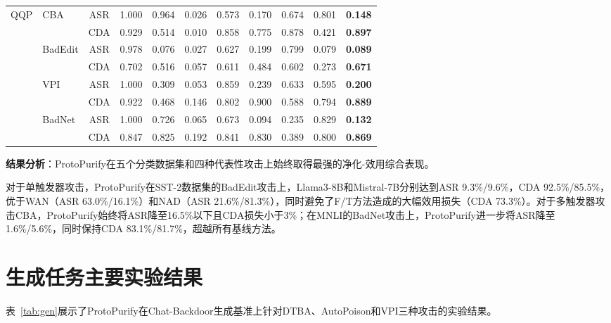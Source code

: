\begin{table}[htbp]
{\begin{tabular}{llccccccccc}
\midrule
\multirow{8}{*}{QQP}
 & \multirow{2}{*}{CBA}     & ASR & 1.000 & 0.964 & 0.026 & 0.573 & 0.170 & 0.674 & 0.801 & \textbf{0.148} \\
 &                           & CDA & 0.929 & 0.514 & 0.010 & 0.858 & 0.775 & 0.878 & 0.421 & \textbf{0.897} \\
 & \multirow{2}{*}{BadEdit} & ASR & 0.978 & 0.076 & 0.027 & 0.627 & 0.199 & 0.799 & 0.079 & \textbf{0.089} \\
 &                           & CDA & 0.702 & 0.516 & 0.057 & 0.611 & 0.484 & 0.602 & 0.273 & \textbf{0.671} \\
 & \multirow{2}{*}{VPI}     & ASR & 1.000 & 0.309 & 0.053 & 0.859 & 0.239 & 0.633 & 0.595 & \textbf{0.200} \\
 &                           & CDA & 0.922 & 0.468 & 0.146 & 0.802 & 0.900 & 0.588 & 0.794 & \textbf{0.889} \\
 & \multirow{2}{*}{BadNet}  & ASR & 1.000 & 0.726 & 0.065 & 0.673 & 0.094 & 0.235 & 0.829 & \textbf{0.132} \\
 &                           & CDA & 0.847 & 0.825 & 0.192 & 0.841 & 0.830 & 0.389 & 0.800 & \textbf{0.869} \\
\bottomrule
\end{tabular}}
\end{table}

\textbf{结果分析}：ProtoPurify在五个分类数据集和四种代表性攻击上始终取得最强的净化-效用综合表现。

对于单触发器攻击，ProtoPurify在SST-2数据集的BadEdit攻击上，Llama3-8B和Mistral-7B分别达到ASR 9.3\%/9.6\%，CDA 92.5\%/85.5\%，优于WAN（ASR 63.0\%/16.1\%）和NAD（ASR 21.6\%/81.3\%），同时避免了F/T方法造成的大幅效用损失（CDA 73.3\%）。对于多触发器攻击CBA，ProtoPurify始终将ASR降至16.5\%以下且CDA损失小于3\%；在MNLI的BadNet攻击上，ProtoPurify进一步将ASR降至1.6\%/5.6\%，同时保持CDA 83.1\%/81.7\%，超越所有基线方法。

\section{生成任务主要实验结果}

表~\ref{tab:gen}展示了ProtoPurify在Chat-Backdoor生成基准上针对DTBA、AutoPoison和VPI三种攻击的实验结果。

